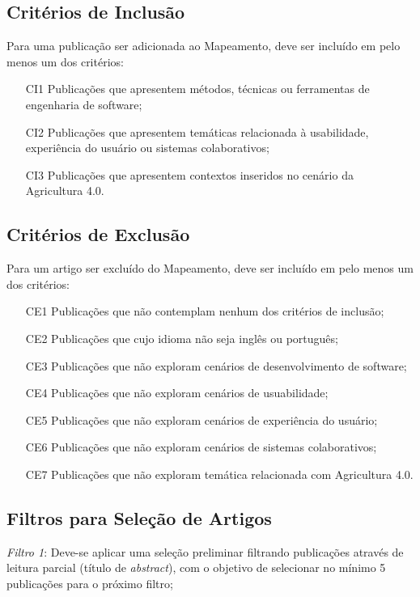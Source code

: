 \documentclass[12pt]{article}
\begin{document}
\subsection{Critérios de Inclusão}

Para uma publicação ser adicionada ao Mapeamento, deve ser incluído em pelo menos um dos critérios:

\begin{itemize}
	\item[CI1] Publicações que apresentem métodos, técnicas ou ferramentas de engenharia de software;
	\item[CI2] Publicações que apresentem temáticas relacionada à usabilidade, experiência do usuário ou sistemas colaborativos;
	\item[CI3] Publicações que apresentem contextos inseridos no cenário da Agricultura 4.0.
\end{itemize} 

\subsection{Critérios de Exclusão}

Para um artigo ser excluído do Mapeamento, deve ser incluído em pelo menos um dos critérios:

\begin{itemize}
	\item[CE1] Publicações que não contemplam nenhum dos critérios de inclusão;
	\item[CE2] Publicações que cujo idioma não seja inglês ou português;
	\item[CE3] Publicações que não exploram cenários de desenvolvimento de software;
	\item[CE4] Publicações que não exploram cenários de usuabilidade;
	\item[CE5] Publicações que não exploram cenários de experiência do usuário;
	\item[CE6] Publicações que não exploram cenários de sistemas colaborativos;
	\item[CE7] Publicações que não exploram temática relacionada com Agricultura 4.0.
\end{itemize} 

\subsection{Filtros para Seleção de Artigos}

\noindent\textit{Filtro 1}: Deve-se aplicar uma seleção preliminar filtrando publicações através de leitura parcial (título de \textit{abstract}), com o objetivo de selecionar no mínimo 5 publicações para o próximo filtro;
\end{document}
